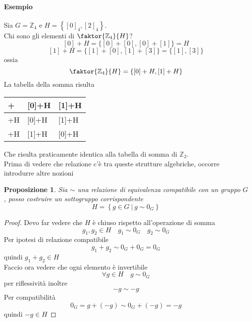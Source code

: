 \documentclass[a4paper]{report}
\newtheorem{proposition}{Proposizione}
\newcommand{\Z}{\ensuremath{\mathbb{Z}}}
\newcommand{\setst}[2]{\ensuremath{\left\{{#1}\ |\ {#2}\right\}}}
\begin{document}
\paragraph{Esempio} Sia $G=\Z_4$ e $H=\left\{[0]_4,[2]_4\right\}$.\\
Chi sono gli elementi di $\faktor{\Z_4}{H}$?
\[
    [0]+H=\{[0]+[0],[0]+[1]\}=H
\]
\[
    [1]+H=\{[1]+[0],[1]+[3]\}=\{[1],[3]\}
\]
ossia
\[
    \faktor{\Z_4}{H}=\{[0]+H,[1]+H\}
\]
La tabella della somma risulta
\begin{table}[H]
    \centering
    \begin{tabular}{|l|l|l|}
        \hline
        +     & [0]+H & [1]+H \\ \hline
        [0]+H & [0]+H & [1]+H \\ \hline
        [1]+H & [1]+H & [0]+H \\ \hline
    \end{tabular}
\end{table}
Che risulta praticamente identica alla tabella di somma di $\Z_2$.\\
Prima di vedere che relazione c'è tra queste strutture algebriche, occorre introdurre altre nozioni
\begin{proposition}
    Sia $\sim$ una relazione di equivalenza compatibile con un gruppo $G$, posso costruire un sottogruppo corrispondente
    \[
        H=\setst{g\in G}{g\sim 0_G}
    \]
\end{proposition}
\begin{proof}
    Devo far vedere che $H$ è chiuso rispetto all'operazione di somma
    \[
        g_1,g_2\in H\quad g_1\sim 0_G\quad g_2\sim 0_G
    \]
    Per ipotesi di relazione compatibile
    \[
        g_1+g_2\sim 0_G+0_G=0_G
    \]
    quindi $g_1+g_2\in H$\\
    Faccio ora vedere che ogni elemento è invertibile
    \[
        \forall g\in H\quad g\sim 0_G
    \]
    per riflessività inoltre
    \[
        -g\sim -g
    \]
    Per compatibilità
    \[
        0_G=g+(-g)\sim 0_G+(-g)=-g
    \]
    quindi $-g\in H$
\end{proof}
\end{document}
